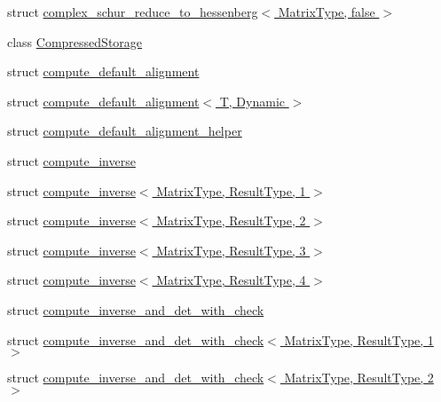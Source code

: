\begin{DoxyCompactItemize}
\item 
struct \hyperlink{struct_eigen_1_1internal_1_1complex__schur__reduce__to__hessenberg_3_01_matrix_type_00_01false_01_4}{complex\+\_\+schur\+\_\+reduce\+\_\+to\+\_\+hessenberg$<$ Matrix\+Type, false $>$}
\item 
class \hyperlink{class_eigen_1_1internal_1_1_compressed_storage}{Compressed\+Storage}
\item 
struct \hyperlink{struct_eigen_1_1internal_1_1compute__default__alignment}{compute\+\_\+default\+\_\+alignment}
\item 
struct \hyperlink{struct_eigen_1_1internal_1_1compute__default__alignment_3_01_t_00_01_dynamic_01_4}{compute\+\_\+default\+\_\+alignment$<$ T, Dynamic $>$}
\item 
struct \hyperlink{struct_eigen_1_1internal_1_1compute__default__alignment__helper}{compute\+\_\+default\+\_\+alignment\+\_\+helper}
\item 
struct \hyperlink{struct_eigen_1_1internal_1_1compute__inverse}{compute\+\_\+inverse}
\item 
struct \hyperlink{struct_eigen_1_1internal_1_1compute__inverse_3_01_matrix_type_00_01_result_type_00_011_01_4}{compute\+\_\+inverse$<$ Matrix\+Type, Result\+Type, 1 $>$}
\item 
struct \hyperlink{struct_eigen_1_1internal_1_1compute__inverse_3_01_matrix_type_00_01_result_type_00_012_01_4}{compute\+\_\+inverse$<$ Matrix\+Type, Result\+Type, 2 $>$}
\item 
struct \hyperlink{struct_eigen_1_1internal_1_1compute__inverse_3_01_matrix_type_00_01_result_type_00_013_01_4}{compute\+\_\+inverse$<$ Matrix\+Type, Result\+Type, 3 $>$}
\item 
struct \hyperlink{struct_eigen_1_1internal_1_1compute__inverse_3_01_matrix_type_00_01_result_type_00_014_01_4}{compute\+\_\+inverse$<$ Matrix\+Type, Result\+Type, 4 $>$}
\item 
struct \hyperlink{struct_eigen_1_1internal_1_1compute__inverse__and__det__with__check}{compute\+\_\+inverse\+\_\+and\+\_\+det\+\_\+with\+\_\+check}
\item 
struct \hyperlink{struct_eigen_1_1internal_1_1compute__inverse__and__det__with__check_3_01_matrix_type_00_01_result_type_00_011_01_4}{compute\+\_\+inverse\+\_\+and\+\_\+det\+\_\+with\+\_\+check$<$ Matrix\+Type, Result\+Type, 1 $>$}
\item 
struct \hyperlink{struct_eigen_1_1internal_1_1compute__inverse__and__det__with__check_3_01_matrix_type_00_01_result_type_00_012_01_4}{compute\+\_\+inverse\+\_\+and\+\_\+det\+\_\+with\+\_\+check$<$ Matrix\+Type, Result\+Type, 2 $>$}

\end{DoxyCompactItemize}
